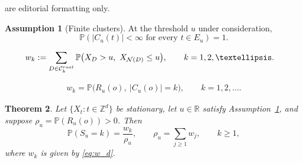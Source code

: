 \documentclass[10pt,a4paper]{amsart}
\newtheorem{theorem}{Theorem}[section]
\theoremstyle{definition}
\newtheorem{assumption}[theorem]{Assumption}
\def\R{{\mathbb R}}
\def\P{{\mathbb P}}
\def\Z{{\mathbb Z}}
\begin{document}
are editorial formatting only.\par\smallskip
\setcounter{section}{1}
\setcounter{equation}{0}
\setcounter{axiom}{0}
\setcounter{theorem}{0}
	\begin{assumption}[Finite clusters]\label{ass:finite-cluster}
		At the threshold $u$ under consideration,
		\begin{equation*}
			\mathbb P\left(
			|C_u(t)|<\infty \text{ for every }t\in E_u
			\right)=1.
		\end{equation*}
	\end{assumption}

\setcounter{section}{2}
\setcounter{equation}{6}
\setcounter{axiom}{0}
\setcounter{theorem}{1}
	\begin{equation}\label{eq:w_d}
		\begin{split}
			w_k
			&:=\sum_{D\in\mathcal{C}_k^{\rm root}}
			\P\bigl(X_D>u,\ X_{\mathcal{N}(D)}\le u\bigr),
			\qquad k=1,2,\ldots.
		\end{split}
	\end{equation}

\setcounter{section}{2}
\setcounter{equation}{7}
\setcounter{axiom}{0}
\setcounter{theorem}{1}
	\begin{equation}\label{eq:w_d_2}
		\begin{split}
			w_k =\P\bigl(R_u(o),\ |C_u(o)|=k\bigr),
			\qquad k=1,2,\ldots.
		\end{split}
	\end{equation}

\setcounter{section}{2}
\setcounter{equation}{8}
\setcounter{axiom}{0}
\setcounter{theorem}{1}
	\begin{theorem}\label{thm:CSD_d}
		Let $\{X_t:t\in\Z^d\}$ be stationary, let $u\in\R$ satisfy
		Assumption~\ref{ass:finite-cluster}, and suppose
		$\rho_u=\P(R_u(o))>0$.  Then
		\begin{equation}\label{eq:CSD_d}
			\P(S_u=k)=\frac{w_k}{\rho_u},
			\qquad
			\rho_u=\sum_{j\geq1}w_j,
			\qquad k\geq1,
		\end{equation}
		where $w_k$ is given by \eqref{eq:w_d}.
	\end{theorem}
\end{document}

